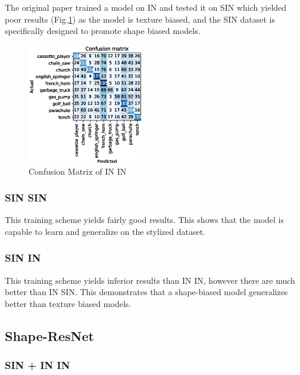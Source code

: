 \documentclass{article}
\begin{document}
The original paper trained a model on IN and tested it on SIN which yielded poor results (Fig.\ref{fig:cm_in-sin}) as 
the model is texture biased, and the SIN dataset is specifically designed to promote shape biased models.

\begin{figure}[h!]
  \includegraphics[width = 0.45\textwidth]{imgs/in/in-sin/in-sin_confusion_matrix_0.313.eps}
  \caption{Confusion Matrix of IN \texorpdfstring{\textrightarrow} .IN}
  \label{fig:cm_in-sin}
\end{figure}

\subsubsection{SIN \texorpdfstring{\textrightarrow} .SIN}
This training scheme yields fairly good results. This shows that the model is capable to learn
and generalize on the stylized dataset.

\subsubsection{SIN \texorpdfstring{\textrightarrow} .IN}

This training scheme yields inferior results than IN \texorpdfstring{\textrightarrow} IIN, however
there are much better than IN \texorpdfstring{\textrightarrow} .SIN.
This demonstrates that a shape-biased model generalizes better than texture biased models.

\subsection{Shape-ResNet}

\subsubsection{SIN + IN \texorpdfstring{\textrightarrow} .IN}
\end{document}
